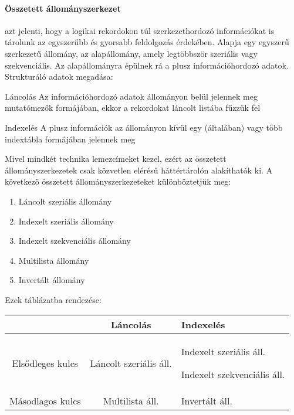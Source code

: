 \paragraph{Összetett állományszerkezet} azt jelenti, hogy a logikai rekordokon túl szerkezethordozó információkat is tárolunk az egyszerűbb és gyorsabb feldolgozás érdekében. Alapja egy egyszerű szerkezetű állomány, az alapállomány, amely legtöbbször szeriális vagy szekvenciális. Az alapállományra épülnek rá a plusz információhordozó adatok.  Strukturáló adatok megadása:
\begin{enumdescript}[nosep]
	\item[Láncolás] Az információhordozó adatok állományon belül jelennek meg mutatómezők formájában, ekkor a rekordokat láncolt listába fűzzük fel
	\item[Indexelés] A plusz információk az állományon kívül egy (általában) vagy több indextábla formájában jelennek meg
\end{enumdescript}
Mivel mindkét technika lemezcímeket kezel, ezért az összetett állományszerkezetek csak közvetlen elérésű háttértárolón alakíthatók ki. A következő összetett állományszerkezeteket különböztetjük meg:
\begin{enumerate}[nosep]
	\item Láncolt szeriális állomány
	\item Indexelt szeriális állomány
	\item Indexelt szekvenciális állomány
	\item Multilista állomány
	\item Invertált állomány
\end{enumerate}
Ezek táblázatba rendezése:\\
\begin{tabularx}{0.75\linewidth}{|c|c|X|}
	\hline 
	~ & Láncolás & Indexelés \\ 
	\hline 
	Elsődleges kulcs & Láncolt szeriális áll. & Indexelt szeriális áll.
	
	Indexelt szekvenciális áll. \\ 
	\hline 
	Másodlagos kulcs & Multilista áll. & Invertált áll. \\ 
	\hline 
\end{tabularx} 